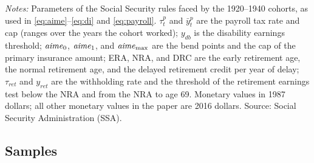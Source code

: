 \begin{table}[!htbp]
\centering
\caption{Social Security Parameters}
\label{tab:ssparams}
\vspace{6pt}
\footnotesize
\begin{threeparttable}

\begin{tablenotes}[flushleft]\scriptsize
\item[] \textit{Notes:} Parameters of the Social Security rules faced by the 1920--1940 cohorts, as used in \eqref{eq:aime}--\eqref{eq:di} and \eqref{eq:payroll}. $\tau^p_t$ and $\bar{y}^p_t$ are the payroll tax rate and cap (ranges over the years the cohort worked); $y_{db}$ is the disability earnings threshold; $\mathit{aime}_0$, $\mathit{aime}_1$, and $\mathit{aime}_{\max}$ are the bend points and the cap of the primary insurance amount; ERA, NRA, and DRC are the early retirement age, the normal retirement age, and the delayed retirement credit per year of delay; $\tau_{ret}$ and $y_{ret}$ are the withholding rate and the threshold of the retirement earnings test below the NRA and from the NRA to age 69. Monetary values in 1987 dollars; all other monetary values in the paper are 2016 dollars. Source: Social Security Administration (SSA).
\end{tablenotes}
\end{threeparttable}
\end{table}

\subsection{Samples}\label{app:samples}

